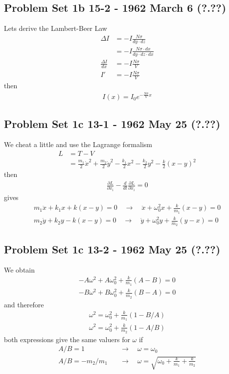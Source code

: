 \documentclass[../main.tex]{subfiles}
\begin{document}
\subsection{Problem Set 1b  15-2 - 1962 March 6 (?.??)}
Lets derive the Lambert-Beer Law
\begin{align}
\Delta I
&=-I \frac{N\sigma}{dy\cdot dz}\\
&=-I \frac{N\sigma\cdot dx}{dy\cdot dz\cdot dx}\\
\frac{\Delta I}{dx}&=-I\frac{N\sigma}{V}\\
I'&=-I\frac{N\sigma}{V}
\end{align}
then
\begin{align}
I(x)=I_0e^{-\frac{N\sigma}{V}x}
\end{align}


\subsection{Problem Set 1c 13-1 - 1962 May 25 (?.??)}
We cheat a little and use the Lagrange formalism 
\begin{align}
L&=T-V\\
&=\frac{m_1}{2}\dot{x}^2+\frac{m_2}{2}\dot{y}^2-\frac{k_1}{2}x^2-\frac{k_2}{2}y^2-\frac{k}{2}(x-y)^2
\end{align}
then
\begin{align}
\frac{\partial L}{\partial x_i}-\frac{d}{dt}\frac{\partial L}{\partial\dot{x}_i}=0
\end{align}
gives
\begin{align}
m_1\ddot{x}+k_1x+k(x-y)=0\quad\rightarrow\quad \ddot{x}+\omega_0^2x+\frac{k}{m_1}(x-y)=0\\
m_2\ddot{y}+k_2y-k(x-y)=0\quad\rightarrow\quad \ddot{y}+\omega_0^2y+\frac{k}{m_2}(y-x)=0
\end{align}


\subsection{Problem Set 1c  13-2 - 1962 May 25 (?.??)}
We obtain
\begin{align}
-A\omega^2+A\omega_0^2+\frac{k}{m_1}(A-B)=0\\
-B\omega^2+B\omega_0^2+\frac{k}{m_2}(B-A)=0
\end{align}
and therefore
\begin{align}
\omega^2=\omega_0^2+\frac{k}{m_1}(1-B/A)\\
\omega^2=\omega_0^2+\frac{k}{m_2}(1-A/B)
\end{align}
both expressions give the same valuers for $\omega$ if
\begin{align}
A/B=1\quad&\rightarrow\quad \omega=\omega_0\\
A/B=-m_2/m_1\quad&\rightarrow\quad \omega=\sqrt{\omega_0+\frac{k}{m_1}+\frac{k}{m_2}}
\end{align} 
\end{document}

